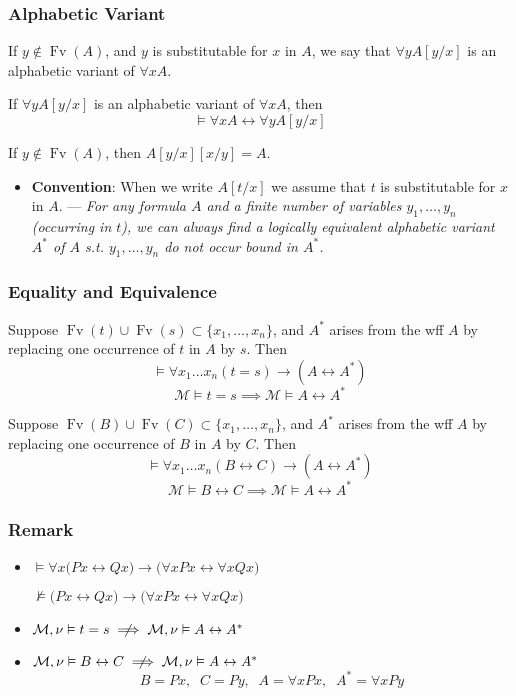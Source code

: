 \documentclass[UTF8,11pt,colorlinks,compress,openany]{beamer}%
\begin{document}
\begin{frame}\frametitle{Alphabetic Variant}
	\begin{definition}
		If $y\notin \operatorname{Fv}(A)$, and $y$ is substitutable for $x$ in $A$, we say that $\forall y A[y/x]$ is an alphabetic variant of $\forall x A$.
	\end{definition}
	\begin{theorem}
		If $\forall y A[y/x]$ is an alphabetic variant of $\forall x A$, then \[\vDash\forall x A\leftrightarrow\forall y A[y/x]\]
	\end{theorem}
	If $y\notin \operatorname{Fv}(A)$, then $A[y/x][x/y]=A$.
	\begin{itemize}
		\item \textbf{Convention}: When we write $A[t/x]$ we assume that $t$ is substitutable for $x$ in $A$. --- \textit{For any formula $A$ and a finite number of variables $y_1,\dots,y_n$ (occurring in $t$), we can always find a logically equivalent alphabetic variant $A^*$ of $A$ s.t. $y_1,\dots,y_n$ do not occur bound in $A^*$.}
	\end{itemize}
\end{frame}

\begin{frame}\frametitle{Equality and Equivalence}
	\begin{lemma}
		Suppose $\operatorname{Fv}(t)\cup \operatorname{Fv}(s)\subset\{x_1,\dots,x_n\}$, and $A^*$ arises from the wff $A$ by replacing one occurrence of $t$ in $A$ by $s$. Then
		\[\vDash\forall x_1\dots x_n(t=s)\to(A\leftrightarrow A^*)\]
		\[\mathcal{M}\vDash t=s\implies\mathcal{M}\vDash A\leftrightarrow A^*\]
	\end{lemma}
	\begin{lemma}
		Suppose $\operatorname{Fv}(B)\cup \operatorname{Fv}(C)\subset\{x_1,\dots,x_n\}$, and $A^*$ arises from the wff $A$ by replacing one occurrence of $B$ in $A$ by $C$. Then
		\[\vDash\forall x_1\dots x_n(B\leftrightarrow C)\to(A\leftrightarrow A^*)\]
		\[\mathcal{M}\vDash B\leftrightarrow C\implies\mathcal{M}\vDash A\leftrightarrow A^*\]
	\end{lemma}
\end{frame}

\begin{frame}\frametitle{Remark}
	\begin{itemize}
		\item $\vDash\forall x\bigl(Px\leftrightarrow Qx\bigr)\to\bigl(\forall x Px\leftrightarrow\forall x Qx\bigr)$
		
		$\nvDash\bigl(Px\leftrightarrow Qx\bigr)\to\bigl(\forall x Px\leftrightarrow\forall x Qx\bigr)$
		\item $\mathcal{M},\nu\vDash t=s\centernot\implies\mathcal{M},\nu\vDash A\leftrightarrow A^*$
		\item $\mathcal{M},\nu\vDash B\leftrightarrow C\centernot\implies\mathcal{M},\nu\vDash A\leftrightarrow A^*$
		\[B=Px,\;\; C=Py,\;\; A=\forall x Px,\;\; A^*=\forall x Py\]
	\end{itemize}
\end{frame}
\end{document}
